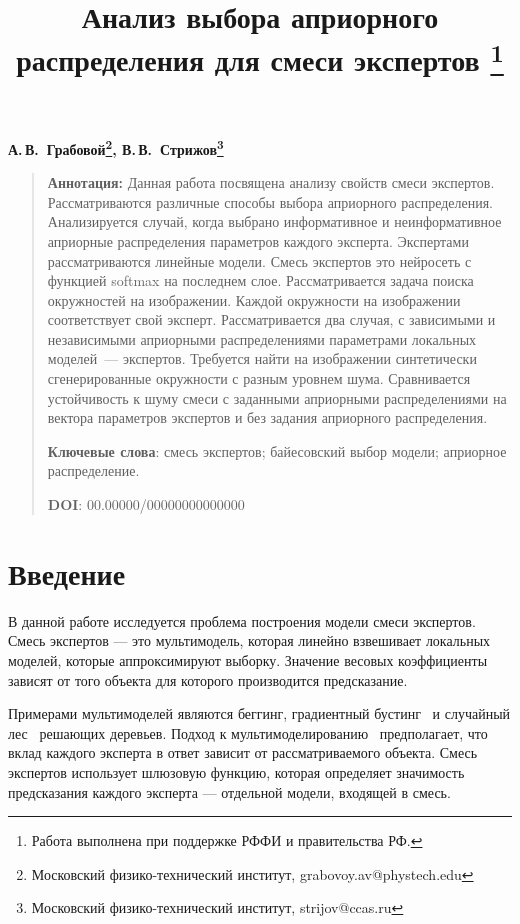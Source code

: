 \documentclass[12pt, twoside]{article}
\numberwithin{equation}{section}
\begin{document}
\title{\bf Анализ выбора априорного распределения для смеси экспертов \thanks{Работа выполнена при поддержке РФФИ и правительства РФ.}}
\date{}
\author{}
\maketitle

\begin{center}
\bf
А.\,В.~Грабовой\footnote{Московский физико-технический институт, grabovoy.av@phystech.edu}, В.\,В.~Стрижов\footnote{Московский физико-технический институт, strijov@ccas.ru}

\end{center}

{\centering\begin{quote}
\textbf{Аннотация:} 
Данная работа посвящена анализу свойств смеси экспертов. Рассматриваются различные способы выбора априорного распределения. Анализируется случай, когда выбрано информативное и неинформативное априорные распределения параметров каждого эксперта. Экспертами рассматриваются линейные модели. Смесь экспертов это нейросеть с функцией softmax на последнем слое. Рассматривается задача поиска окружностей на изображении. Каждой окружности на изображении соответствует свой эксперт. Рассматривается два случая, с зависимыми и независимыми априорными распределениями параметрами локальных моделей~--- экспертов. Требуется найти на изображении синтетически сгенерированные окружности с разным уровнем шума. Сравнивается устойчивость к шуму смеси с заданными априорными распределениями на вектора параметров экспертов и без задания априорного распределения.

\smallskip
\textbf{Ключевые слова}: смесь экспертов; байесовский выбор модели; априорное распределение.

\smallskip
\textbf{DOI}: 00.00000/00000000000000
\end{quote}
}

\section{Введение}
В данной работе исследуется проблема построения модели смеси экспертов. Смесь экспертов --- это мультимодель, которая линейно взвешивает локальных моделей, которые аппроксимируют выборку. Значение весовых коэффициенты зависят от того объекта для которого производится предсказание.

Примерами мультимоделей являются беггинг, градиентный бустинг~\cite{Tianqi2016} и случайный лес~\cite{Ishwaran2012} решающих деревьев. Подход к мультимоделированию~\cite{Yuksel2012} предполагает, что вклад каждого эксперта в ответ зависит от рассматриваемого объекта. Смесь экспертов использует шлюзовую функцию, которая определяет значимость предсказания каждого эксперта --- отдельной модели, входящей в смесь.
\end{document}
